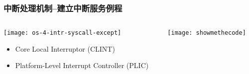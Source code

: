 \begin{frame}[plain,t]
	\frametitle{中断处理机制--建立中断服务例程}
	\begin{columns}
		
		\begin{column}{0.4\textwidth}
			\centering
			\texttt{[image: os-4-intr-syscall-except]}
			\begin{itemize} \small
				\item Core Local	Interruptor (CLINT)
				\item Platform-Level Interrupt Controller (PLIC)
			\end{itemize}
			
		\end{column}
		
		\begin{column}{0.6\textwidth}
			
			\centering
			
			\texttt{[image: showmethecode]}
		
		\end{column}
		
	\end{columns}
	
\end{frame}


